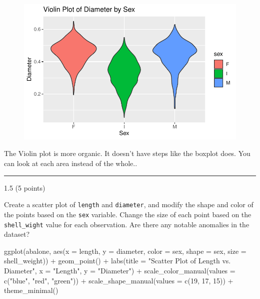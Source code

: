 \documentclass[
  letterpaper,
  DIV=11,
  numbers=noendperiod]{scrartcl}
\newenvironment{Shaded}{\begin{snugshade}}{\end{snugshade}}
\newcommand{\AttributeTok}[1]{\textcolor[rgb]{0.40,0.45,0.13}{#1}}
\newcommand{\DecValTok}[1]{\textcolor[rgb]{0.68,0.00,0.00}{#1}}
\newcommand{\FunctionTok}[1]{\textcolor[rgb]{0.28,0.35,0.67}{#1}}
\newcommand{\NormalTok}[1]{\textcolor[rgb]{0.00,0.23,0.31}{#1}}
\newcommand{\SpecialCharTok}[1]{\textcolor[rgb]{0.37,0.37,0.37}{#1}}
\newcommand{\StringTok}[1]{\textcolor[rgb]{0.13,0.47,0.30}{#1}}
\begin{document}
\begin{figure}[H]

{\centering \includegraphics{hw2_files/figure-pdf/unnamed-chunk-6-1.pdf}

}

\end{figure}

The Violin plot is more organic. It doesn't have steps like the boxplot
does. You can look at each area instead of the whole..

\begin{center}\rule{0.5\linewidth}{0.5pt}\end{center}

1.5 (5 points)

Create a scatter plot of \texttt{length} and \texttt{diameter}, and
modify the shape and color of the points based on the \texttt{sex}
variable. Change the size of each point based on the
\texttt{shell\_wight} value for each observation. Are there any notable
anomalies in the dataset?

\begin{Shaded}
\begin{Highlighting}[]
\FunctionTok{ggplot}\NormalTok{(abalone, }\FunctionTok{aes}\NormalTok{(}\AttributeTok{x =}\NormalTok{ length, }\AttributeTok{y =}\NormalTok{ diameter, }\AttributeTok{color =}\NormalTok{ sex, }\AttributeTok{shape =}\NormalTok{ sex, }\AttributeTok{size =}\NormalTok{ shell\_weight)) }\SpecialCharTok{+}
  \FunctionTok{geom\_point}\NormalTok{() }\SpecialCharTok{+}
  \FunctionTok{labs}\NormalTok{(}\AttributeTok{title =} \StringTok{"Scatter Plot of Length vs. Diameter"}\NormalTok{,}
       \AttributeTok{x =} \StringTok{"Length"}\NormalTok{, }\AttributeTok{y =} \StringTok{"Diameter"}\NormalTok{) }\SpecialCharTok{+}
  \FunctionTok{scale\_color\_manual}\NormalTok{(}\AttributeTok{values =} \FunctionTok{c}\NormalTok{(}\StringTok{"blue"}\NormalTok{, }\StringTok{"red"}\NormalTok{, }\StringTok{"green"}\NormalTok{)) }\SpecialCharTok{+}
  \FunctionTok{scale\_shape\_manual}\NormalTok{(}\AttributeTok{values =} \FunctionTok{c}\NormalTok{(}\DecValTok{19}\NormalTok{, }\DecValTok{17}\NormalTok{, }\DecValTok{15}\NormalTok{)) }\SpecialCharTok{+}
  \FunctionTok{theme\_minimal}\NormalTok{()}
\end{Highlighting}
\end{Shaded}
\end{document}
